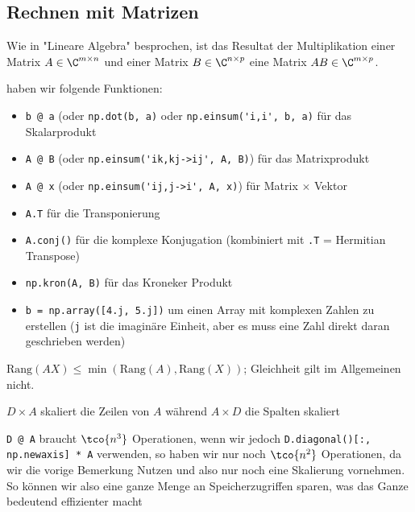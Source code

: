 
\newsection
\subsection{Rechnen mit Matrizen}
Wie in "Lineare Algebra" besprochen, ist das Resultat der Multiplikation einer Matrix $A \in \C^{m \times n}$ und einer Matrix $B \in \C^{n \times p}$ eine Matrix $AB \in \C^{m \times p}$.

\innumpy haben wir folgende Funktionen:
\begin{itemize}
    \item \verb|b @ a| (oder \verb|np.dot(b, a)| oder \verb|np.einsum('i,i', b, a)| für das Skalarprodukt
    \item \verb|A @ B| (oder \verb|np.einsum('ik,kj->ij', A, B)|) für das Matrixprodukt
    \item \verb|A @ x| (oder \verb|np.einsum('ij,j->i', A, x)|) für Matrix $\times$ Vektor
    \item \verb|A.T| für die Transponierung
    \item \verb|A.conj()| für die komplexe Konjugation (kombiniert mit \verb|.T| = Hermitian Transpose)
    \item \verb|np.kron(A, B)| für das Kroneker Produkt
    \item \verb|b = np.array([4.j, 5.j])| um einen Array mit komplexen Zahlen zu erstellen (\verb|j| ist die imaginäre Einheit, aber es muss eine Zahl direkt daran geschrieben werden)
\end{itemize}


 $\text{Rang}(AX) \leq \min(\text{Rang}(A), \text{Rang}(X))$; Gleichheit gilt im Allgemeinen nicht.

 $D \times A$ skaliert die Zeilen von $A$ während $A \times D$ die Spalten skaliert

\inlineex \verb|D @ A| braucht $\tco{n^3}$ Operationen, wenn wir jedoch \verb|D.diagonal()[:, np.newaxis] * A| verwenden, so haben wir nur noch $\tco{n^2}$ Operationen, da wir die vorige Bemerkung Nutzen und also nur noch eine Skalierung vornehmen.
So können wir also eine ganze Menge an Speicherzugriffen sparen, was das Ganze bedeutend effizienter macht

